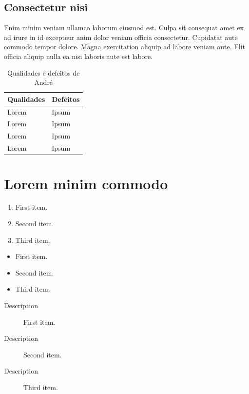 \documentclass[12pt]{report}
\begin{document}
\subsection{Consectetur nisi}

Enim minim veniam ullamco laborum eiusmod est. Culpa sit consequat amet ex ad irure in id excepteur anim dolor veniam officia consectetur. Cupidatat aute commodo tempor dolore. Magna exercitation aliquip ad labore veniam aute. Elit officia aliquip nulla ea nisi laboris aute est labore.

\renewcommand{\arraystretch}{2} %
\begin{table}[h]
    \centering
    \begin{tabularx}{0.8\textwidth}{X|X} %
        \textbf{Qualidades} & \textbf{Defeitos} \\ \hline
        Lorem               & Ipsum             \\ \hline
        Lorem               & Ipsum             \\ \hline
        Lorem               & Ipsum             \\ \hline
        Lorem               & Ipsum
    \end{tabularx}
    \caption[André]{Qualidades e defeitos de André}
    \label{tab:duda}
\end{table}

\section{Lorem minim commodo}

\begin{enumerate}
    \item First item.
    \item Second item.
    \item Third item.
\end{enumerate}

\begin{itemize}
    \item First item.
    \item Second item.
    \item Third item.
\end{itemize}

\begin{description}
    \item[\colorbox{myColor2}{\textcolor{myColor1}{Description}}] First item.
    \item[\colorbox{myColor2}{\textcolor{myColor1}{Description}}] Second item.
    \item[\colorbox{myColor2}{\textcolor{myColor1}{Description}}] Third item.
\end{description}
\end{document}
